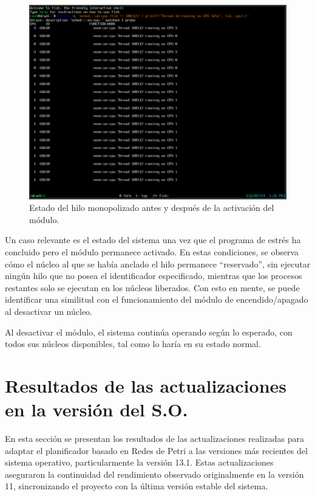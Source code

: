 \begin{figure}[H]
    \centering
    \includegraphics[width=1\textwidth]{images/cpuMonopolized-dtrace.png}
    \caption{Estado del hilo monopolizado antes y después de la activación del módulo.}
    \label{fig:cpuMonopolized-dtrace}
\end{figure}

Un caso relevante es el estado del sistema una vez que el programa de estrés ha concluido pero el módulo permanece activado. En estas condiciones, se observa cómo el núcleo al que se había anclado el hilo permanece “reservado”, sin ejecutar ningún hilo que no posea el identificador especificado, mientras que los procesos restantes solo se ejecutan en los núcleos liberados. Con esto en mente, se puede identificar una similitud con el funcionamiento del módulo de encendido/apagado al desactivar un núcleo.\par

Al desactivar el módulo, el sistema continúa operando según lo esperado, con todos sus núcleos disponibles, tal como lo haría en su estado normal.\par

\section{Resultados de las actualizaciones en la versión del S.O.}

En esta sección se presentan los resultados de las actualizaciones realizadas para adaptar el planificador basado en Redes de Petri a las versiones más recientes del sistema operativo, particularmente la versión 13.1. Estas actualizaciones aseguraron la continuidad del rendimiento observado originalmente en la versión 11, sincronizando el proyecto con la última versión estable del sistema.\par

